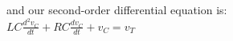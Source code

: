 \documentclass[preview]{standalone}
\begin{document}
\begin{center}
and our second-order differential equation is: \\ 
                    $ LC\frac{d^2v_C}{dt} + RC\frac{dv_C}{dt} + v_C = v_T $
\end{center}
\end{document}
